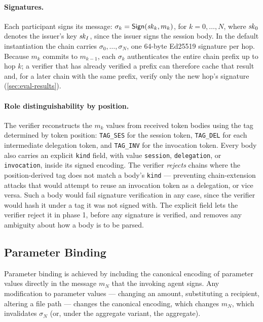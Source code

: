 \documentclass[11pt,a4paper]{article}
\begin{document}
\paragraph{Signatures.}
Each participant signs its message: $\sigma_k = \mathsf{Sign}(\mathit{sk}_k, m_k)$, for
$k = 0, \ldots, N$, where $\mathit{sk}_0$ denotes the issuer's key $\mathit{sk}_I$,
since the issuer signs the session body. In the default instantiation the chain carries
$\sigma_0, \ldots, \sigma_N$, one 64-byte Ed25519 signature per hop.
Because $m_k$ commits to $m_{k-1}$, each $\sigma_k$ authenticates the
entire chain prefix up to hop $k$; a verifier that has already verified
a prefix can therefore cache that result and, for a later chain with the
same prefix, verify only the new hop's signature
(\cref{sec:eval-results}).

\paragraph{Role distinguishability by position.}
The verifier reconstructs the $m_k$ values from received token bodies
using the tag determined by token position: \texttt{TAG\_SES} for the
session token, \texttt{TAG\_DEL} for each intermediate delegation
token, and \texttt{TAG\_INV} for the invocation token. Every body also
carries an explicit \texttt{kind} field, with value \texttt{session},
\texttt{delegation}, or \texttt{invocation}, inside its signed encoding.
The verifier \emph{rejects} chains where the position-derived tag does
not match a body's \texttt{kind} --- preventing chain-extension attacks
that would attempt to reuse an invocation token as a delegation, or vice
versa. Such a body would fail signature verification in any case, since
the verifier would hash it under a tag it was not signed with. The
explicit field lets the verifier reject it in phase 1, before any
signature is verified, and removes any ambiguity about how a body is to
be parsed.

\subsection{Parameter Binding}
\label{sec:protocol-params}

Parameter binding is achieved by including the canonical encoding of
parameter values directly in the message $m_N$ that the invoking agent
signs. Any modification to parameter values --- changing an amount,
substituting a recipient, altering a file path --- changes the
canonical encoding, which changes $m_N$, which invalidates $\sigma_N$
(or, under the aggregate variant, the aggregate).
\end{document}
